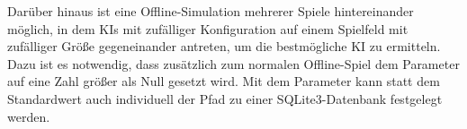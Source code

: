 Darüber hinaus ist eine Offline-Simulation mehrerer Spiele hintereinander möglich, in dem \ac{KI}s mit zufälliger
Konfiguration auf einem Spielfeld mit zufälliger Größe gegeneinander antreten, um die bestmögliche \ac{KI} zu ermitteln.
Dazu ist es notwendig, dass zusätzlich zum normalen Offline-Spiel dem Parameter  auf eine Zahl
größer als Null gesetzt wird.
Mit dem Parameter  kann statt dem Standardwert auch individuell der Pfad zu einer
SQLite3-Datenbank festgelegt werden.
